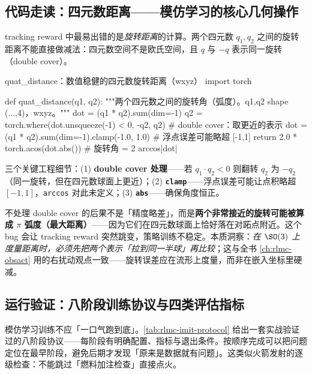 \subsection{代码走读：四元数距离——模仿学习的核心几何操作}
\label{sec:rlmc-imit-track-quat}

tracking reward 中最易出错的是\emph{旋转距离}的计算。两个四元数 $q_1,q_2$ 之间的旋转距离不能直接做减法：四元数空间不是欧氏空间，且 $q$ 与 $-q$ 表示同一旋转（double cover）。

\begin{codebox}[Python]{quat\_distance：数值稳健的四元数旋转距离（wxyz）}
import torch

def quat_distance(q1, q2):
    """两个四元数之间的旋转角（弧度）。q1,q2 shape (...,4)，wxyz。"""
    dot = (q1 * q2).sum(dim=-1)
    q2 = torch.where(dot.unsqueeze(-1) < 0, -q2, q2)   # double cover：取更近的表示
    dot = (q1 * q2).sum(dim=-1).clamp(-1.0, 1.0)       # 浮点误差可能略超 [-1,1]
    return 2.0 * torch.acos(dot.abs())                 # 旋转角 = 2 arccos|dot|
\end{codebox}

三个关键工程细节：(1) \textbf{double cover 处理}——若 $q_1\cdot q_2<0$ 则翻转 $q_2$ 为 $-q_2$（同一旋转，但在四元数球面上更近）；(2) \textbf{\texttt{clamp}}——浮点误差可能让点积略超 $[-1,1]$，\texttt{arccos} 对此未定义；(3) \textbf{\texttt{abs}}——确保角度恒正。

\begin{insight}\label{ins:rlmc-imit-doublecover}
不处理 double cover 的后果不是「精度略差」，而是\textbf{两个非常接近的旋转可能被算成 $\pi$ 弧度（最大距离）}——因为它们在四元数球面上恰好落在对跖点附近。这个 bug 会让 tracking reward 突然跳变，策略训练不稳定。本质洞察：\emph{在 $\SO(3)$ 上度量距离时，必须先把两个表示「拉到同一半球」再比较}；这与全书 \cref{ch:rlmc-obsact} 用的右扰动观点一致——旋转误差应在流形上度量，而非在嵌入坐标里硬减。
\end{insight}

\subsection{运行验证：八阶段训练协议与四类评估指标}
\label{sec:rlmc-imit-track-protocol}

模仿学习训练不应「一口气跑到底」。\cref{tab:rlmc-imit-protocol} 给出一套实战验证过的八阶段协议——每阶段有明确配置、指标与退出条件。按顺序完成可以把问题定位在最早阶段，避免后期才发现「原来是数据就有问题」。这类似火箭发射的逐级检查：不能跳过「燃料加注检查」直接点火。

